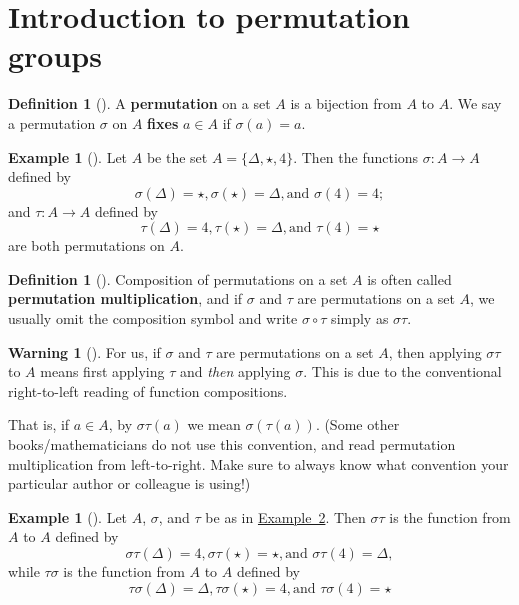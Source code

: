 \documentclass[10pt,]{book}
\newcommand{\terminology}[1]{\textbf{#1}}
\theoremstyle{plain}
\theoremstyle{definition}
\newtheorem{definition}[theorem]{Definition}
\theoremstyle{definition}
\newtheorem{warning}[theorem]{Warning}
\theoremstyle{definition}
\newtheorem{example}[theorem]{Example}
\theoremstyle{definition}
\numberwithin{equation}{section}
\begin{document}
\section[{Introduction to permutation groups}]{Introduction to permutation groups}\label{section-17}
\begin{definition}[{}]\label{definition-42}
A \terminology{permutation} on a set \(A\) is a bijection from \(A\) to \(A\). We say a permutation \(\sigma\) on \(A\) \terminology{fixes} \(a\in
A\) if \(\sigma(a)=a\).%
\end{definition}
\begin{example}[]\label{stperm}
Let \(A\) be the set \(A=\{\Delta, \star, 4\}\). Then the functions \(\sigma : A\to A\) defined by%
\begin{equation*}
\sigma(\Delta)=\star,
\sigma(\star)=\Delta,  \text{and }  \sigma(4)=4;
\end{equation*}
and \(\tau : A\to A\) defined by%
\begin{equation*}
\tau(\Delta)=4, 
\tau(\star)=\Delta,  \text{and }  \tau(4)=\star
\end{equation*}
are both permutations on \(A\).%
\end{example}
\begin{definition}[{}]\label{definition-43}
Composition of permutations on a set \(A\) is often called \terminology{permutation multiplication}, and if \(\sigma\) and \(\tau\) are permutations on a set \(A\), we usually omit the composition symbol and write \(\sigma \circ \tau\) simply as \(\sigma \tau\).%
\end{definition}
\begin{warning}[]\label{warning-16}
For us, if \(\sigma\) and \(\tau\) are permutations on a set \(A\), then applying \(\sigma \tau\) to \(A\) means first applying \(\tau\) and \emph{then} applying \(\sigma\). This is due to the conventional right-to-left reading of function compositions.%
\end{warning}
That is, if \(a\in A\), by \(\sigma \tau(a)\) we mean \(\sigma(\tau(a))\). (Some other books/mathematicians do not use this convention, and read permutation multiplication from left-to-right. Make sure to always know what convention your particular author or colleague is using!)%
\begin{example}[]\label{example-49}
Let \(A\), \(\sigma\), and \(\tau\) be as in \hyperref[stperm]{Example~2}. Then \(\sigma \tau\) is the function from \(A\) to \(A\) defined by%
\begin{equation*}
\sigma \tau(\Delta)=4,  \sigma \tau(\star)=\star,  \text{and }  \sigma \tau(4)=\Delta,
\end{equation*}
while \(\tau \sigma\) is the function from \(A\) to \(A\) defined by%
\begin{equation*}
\tau \sigma (\Delta)=\Delta,  \tau \sigma (\star)=4,  \text{and }  \tau \sigma(4)=\star
\end{equation*}
%
\end{example}
\end{document}
